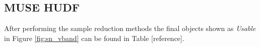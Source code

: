 \documentclass[12pt, twocolumn]{revtex4-1}    %
\begin{document}


\subsection{MUSE HUDF}
\noindent

After performing the sample reduction methods the final objects shown as \textit{Usable} in Figure \ref{fig:sn_vband} can be found in Table [reference].
\end{document}
